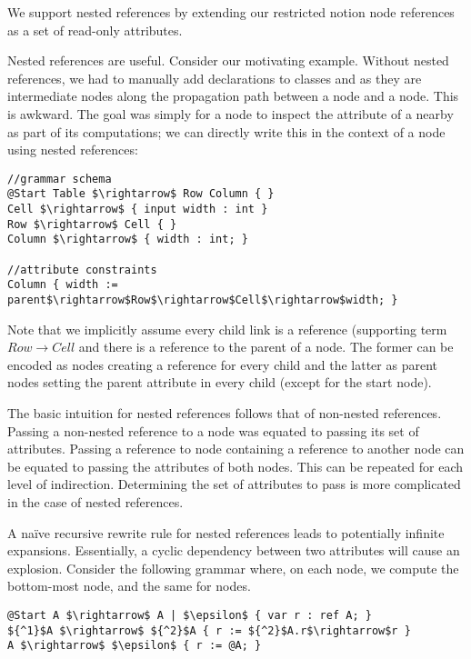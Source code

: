 We support nested references by extending our restricted notion node references as a set of read-only attributes. 

Nested references are useful. Consider our motivating example. Without nested references, we had to manually add declarations to classes  and  as they are intermediate nodes along the propagation path between a  node and a  node. This is awkward. The goal was simply for a  node to inspect the  attribute of a nearby  as part of its computations; we can directly write this in the context of a  node using nested references:


\begin{lstlisting}[mathescape]
//grammar schema
@Start Table $\rightarrow$ Row Column { }
Cell $\rightarrow$ { input width : int }
Row $\rightarrow$ Cell { }
Column $\rightarrow$ { width : int; }

//attribute constraints
Column { width := parent$\rightarrow$Row$\rightarrow$Cell$\rightarrow$width; }

\end{lstlisting}

Note that we implicitly assume every child link is a reference (supporting term $Row \rightarrow Cell$ and there is a reference  to the parent of a node. The former can be encoded as nodes creating a reference for every child and the latter as parent nodes setting the parent attribute in every child (except for the start node).

The basic intuition for nested references follows that of non-nested references. Passing a non-nested reference to a node was equated to passing its set of attributes. Passing a reference to node containing a reference to another node can be equated to passing the attributes of both nodes. This can be repeated for each level of indirection. Determining the set of attributes to pass is more complicated in the case of nested references. 

A na\"{i}ve recursive rewrite rule for nested references leads to potentially infinite expansions. Essentially, a cyclic dependency between two attributes will cause an explosion. Consider the following grammar where, on each  node, we compute the bottom-most  node, and the same for  nodes.


\begin{lstlisting}[mathescape]
@Start A $\rightarrow$ A | $\epsilon$ { var r : ref A; }
${^1}$A $\rightarrow$ ${^2}$A { r := ${^2}$A.r$\rightarrow$r }
A $\rightarrow$ $\epsilon$ { r := @A; }
\end{lstlisting}

